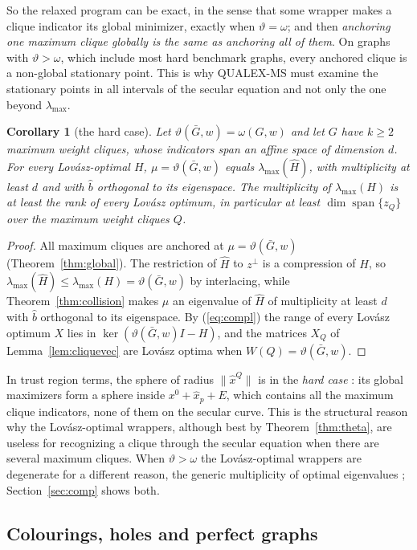 \documentclass[11pt]{article}
\newtheorem{cor}[thm]{Corollary}
\theoremstyle{definition}
\theoremstyle{remark}
\newcommand{\hH}{\hat{H}}
\newcommand{\hb}{\hat{b}}
\newcommand{\hx}{\hat{x}}
\newcommand{\lmax}{\lambda_{\max}}
\newcommand{\vt}{\vartheta(\bar G,w)}
\newcommand{\om}{\omega(G,w)}
\DeclareMathOperator{\spn}{span}
\begin{document}
So the relaxed program can be exact, in the sense that some wrapper makes a
clique indicator its global minimizer, exactly when $\vartheta=\omega$; and
then {\em anchoring one maximum clique globally is the same as anchoring all
of them}. On graphs with $\vartheta>\omega$, which include most hard
benchmark graphs, every anchored clique is a non-global stationary point.
This is why QUALEX-MS must examine the stationary points in all intervals of
the secular equation and not only the one beyond $\lmax$.

\begin{cor}[the hard case]
\label{cor:hard}
Let $\vt=\om$ and let $G$ have $k\geq2$ maximum weight cliques, whose
indicators span an affine space of dimension $d$. For every Lov\'asz-optimal
$H$, $\mu=\vt$ equals $\lmax(\hH)$, with multiplicity at least $d$ and with
$\hb$ orthogonal to its eigenspace. The multiplicity of $\lmax(H)$ is at
least the rank of every Lov\'asz optimum, in particular at least
$\dim\spn\{z_Q\}$ over the maximum weight cliques $Q$.
\end{cor}
\begin{proof}
All maximum cliques are anchored at $\mu=\vt$ (Theorem~\ref{thm:global}).
The restriction of $\hH$ to $z^\perp$ is a compression of $H$, so
$\lmax(\hH)\leq\lmax(H)=\vt$ by interlacing, while
Theorem~\ref{thm:collision} makes $\mu$ an eigenvalue of $\hH$ of
multiplicity at least $d$ with $\hb$ orthogonal to its eigenspace. By
(\ref{eq:compl}) the range of every Lov\'asz optimum $X$ lies in
$\ker(\vt I-H)$, and the matrices $X_Q$ of Lemma~\ref{lem:cliquevec} are
Lov\'asz optima when $W(Q)=\vt$.
\end{proof}

In trust region terms, the sphere of radius $\|\hx^Q\|$ is in the {\em hard
case} \cite{MS83}: its global maximizers form a sphere inside
$x^0+\hx_p+E$, which contains all the maximum clique indicators, none of
them on the secular curve. This is the structural reason why the
Lov\'asz-optimal wrappers, although best by Theorem~\ref{thm:theta}, are
useless for recognizing a clique through the secular equation when there are
several maximum cliques. When $\vartheta>\omega$ the Lov\'asz-optimal wrappers
are degenerate for a different reason, the generic multiplicity of optimal
eigenvalues \cite{O92,P98}; Section~\ref{sec:comp} shows both.

\subsection{Colourings, holes and perfect graphs}
\end{document}
